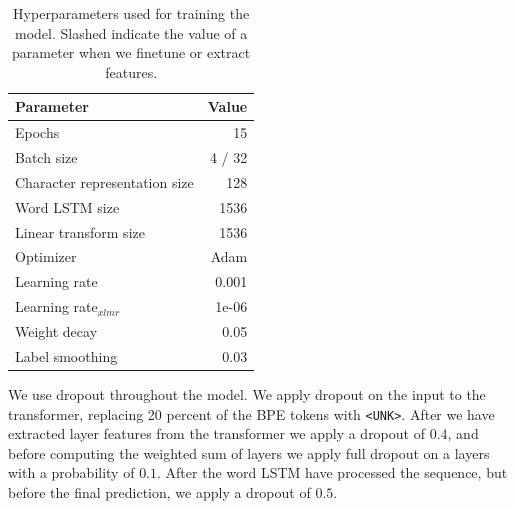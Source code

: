 \documentclass[11pt]{article}
\begin{document}
   
	\begin{table}%
		\centering
		\begin{tabular}{lr}
			Parameter & Value \\
			\hline
			Epochs & 15 \\
			Batch size & 4 / 32 \\
			Character representation size & 128 \\
            Word LSTM size & 1536 \\
            Linear transform size & 1536 \\
			Optimizer & Adam \\
			Learning rate & 0.001 \\
			Learning rate$_{xlmr}$ & 1e-06 \\
            Weight decay & 0.05 \\
			Label smoothing & 0.03 \\
		\end{tabular}
		\caption{\label{tab:parameters} Hyperparameters used for training the model. Slashed indicate the value of a parameter when we finetune or extract features.}
	\end{table}

        We use dropout throughout the model. We apply dropout on the
        input to the transformer, replacing 20 percent of the BPE tokens
        with \texttt{<UNK>}. After we have extracted layer features
        from the transformer we apply a dropout of $0.4$, and before
        computing the weighted sum of layers we apply full dropout on
        a layers with a probability of $0.1$. After the word LSTM have
        processed the sequence, but before the final prediction, we
        apply a dropout of $0.5$.
\end{document}
